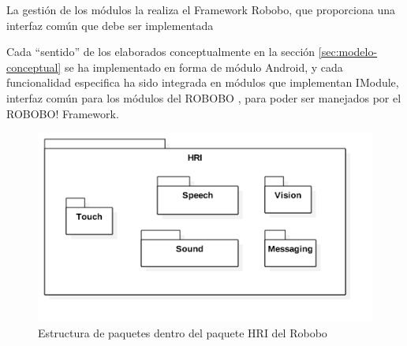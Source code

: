 La gestión de los módulos la realiza el Framework Robobo, que proporciona una interfaz común que debe ser implementada


Cada \enquote{sentido} de los elaborados conceptualmente en la sección \ref{sec:modelo-conceptual} se ha implementado en forma de módulo Android, y cada funcionalidad especifica ha sido integrada en módulos que implementan IModule, interfaz común para los módulos del ROBOBO , para poder ser manejados por el ROBOBO! Framework\cite{RoboboFramework}.

\begin{figure}
	\centering
	\includegraphics[width=1\linewidth]{imagenes/diagramas/PaquetesGenerales.png}
	\caption{Estructura de paquetes dentro del paquete HRI del Robobo}
	\label{fig:general-package-structure}
\end{figure}


